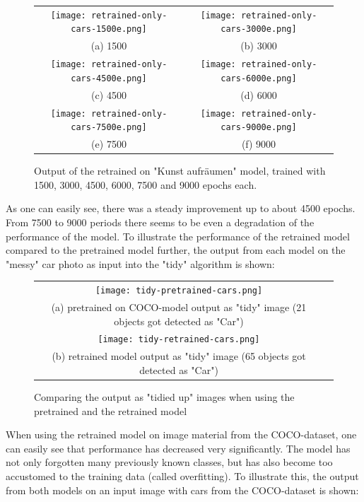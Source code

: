 \begin{figure}[H]
\begin{tabular}{cc}
 \texttt{[image: retrained-only-cars-1500e.png]} &   \texttt{[image: retrained-only-cars-3000e.png]} \\
 (a) 1500 & (b) 3000 \\[6pt]
 \texttt{[image: retrained-only-cars-4500e.png]} &   \texttt{[image: retrained-only-cars-6000e.png]} \\
(c) 4500 & (d) 6000 \\[6pt]
 \texttt{[image: retrained-only-cars-7500e.png]} &   \texttt{[image: retrained-only-cars-9000e.png]} \\
(e) 7500 & (f) 9000 \\[6pt]
\end{tabular}
\caption{Output of the retrained on "Kunst aufräumen" model, trained with 1500, 3000, 4500, 6000, 7500 and 9000 epochs each.}
\label{fig:epochs-output}
\end{figure}

As one can easily see, there was a steady improvement up to about 4500 epochs. From 7500 to 9000 periods there seems to be even a degradation of the performance of the model. To illustrate the performance of the retrained model compared to the pretrained model further, the output from each model on the "messy" car photo as input into the "tidy" algorithm is shown:

\begin{figure}[H]
\begin{tabular}{cc}
 \texttt{[image: tidy-pretrained-cars.png]} \\
 (a) pretrained on COCO-model output as "tidy" image (21 objects got detected as "Car") \\[6pt]
 \texttt{[image: tidy-retrained-cars.png]} \\
 (b) retrained  model output as "tidy" image (65 objects got detected as "Car")  \\[6pt]
\end{tabular}
\caption{Comparing the output as "tidied up" images when using the pretrained and the retrained model}
\label{fig:compare-output}
\end{figure}

When using the retrained model on image material from the COCO-dataset, one can easily see that performance has decreased very significantly. The model has not only forgotten many previously known classes, but has also become too accustomed to the training data (called overfitting). To illustrate this, the output from both models on an input image with cars from the COCO-dataset is shown:

